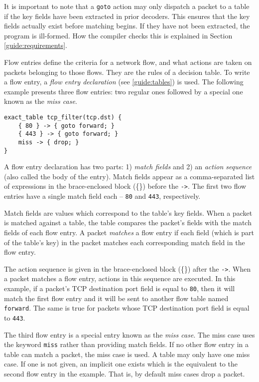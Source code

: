 It is important to note that a \texttt{goto} action may only dispatch
a packet to a table if the key fields have been extracted in prior decoders. This ensures that the key fields actually exist before matching begins. If they have not been extracted, the program is ill-formed. How the compiler checks this is explained in Section \ref{guide:requirements}.

Flow entries define the criteria for a network flow, and
what actions are taken on packets belonging to those flows.
They are the rules of a decision table.
To write a flow entry, a \textit{flow entry declaration}
(see \ref{guide:tables}) is used.
The following example presents three flow entries:
two regular ones followed by a special one known as the \emph{miss case}.

\begin{codepage}
\begin{lstlisting}
exact_table tcp_filter(tcp.dst) {
	{ 80 } -> { goto forward; }
	{ 443 } -> { goto forward; }
	miss -> { drop; }
}
\end{lstlisting}
\end{codepage}

A flow entry declaration has two parts: 1) \textit{match
fields} and 2) an \textit{action sequence} (also called the body of the entry). 
Match fields appear as a comma-separated list of expressions 
in the brace-enclosed block (\{\}) before the \texttt{->}. 
The first two flow entries have a single match field each --
\texttt{80} and \texttt{443}, respectively.

Match fields are values which correspond to the table's key fields. 
When a packet is matched against a table,
the table compares the packet's fields with the match fields of each flow entry.
A packet \textit{matches} a flow entry if each field (which is part of the
table's key) in the packet matches each corresponding match field in the flow 
entry. 

The action sequence is given in the brace-enclosed block (\{\}) after the \texttt{->}. When a packet matches a flow entry, actions in this
sequence are executed.
In this example, if a packet's TCP destination port field is equal to \texttt{80},
then it will match the first flow entry and it will be sent to another flow table
named \texttt{forward}. The same is true for packets whose TCP destination
port field is equal to \texttt{443}.

The third flow entry is a special entry known as the \textit{miss case}. The miss 
case uses the keyword \texttt{miss} rather than providing match fields. If no 
other flow entry in a table can match a packet, the miss case is used. A table 
may only have one miss case. If one is not given, an implicit one exists which 
is the equivalent to the second flow entry in the example. That is, by default 
miss cases drop a packet.

